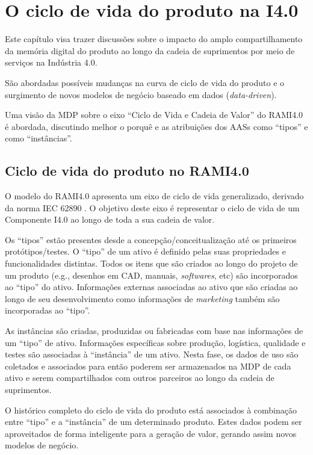 \chapter{O ciclo de vida do produto na I4.0}
\label{cha:ciclo-de-vida}
	
	Este capítulo visa trazer discussões sobre o impacto do amplo compartilhamento da memória digital do produto ao longo da cadeia de suprimentos por meio de serviços na Indústria 4.0.
	
	São abordadas possíveis mudanças na curva de ciclo de vida do produto e o surgimento de novos modelos de negócio baseado em dados (\textit{data-driven}).
	
	Uma visão da MDP sobre o eixo ``Ciclo de Vida e Cadeia de Valor'' do RAMI4.0 é abordada, discutindo melhor o porquê e as atribuições dos AASs como ``tipos'' e como ``instâncias''.

\section{Ciclo de vida do produto no RAMI4.0}
	
	O modelo do RAMI4.0 apresenta um eixo de ciclo de vida generalizado, derivado da norma IEC 62890 \cite{adolphs2015rami}. O objetivo deste eixo é representar o ciclo de vida de um Componente I4.0 ao longo de toda a sua cadeia de valor.
	
	Os ``tipos'' estão presentes desde a concepção/conceitualização até os primeiros protótipos/testes. O ``tipo'' de um ativo é definido pelas suas propriedades e funcionalidades distintas. Todos os itens que são criados ao longo do projeto de um produto (e.g., desenhos em CAD, manuais, \textit{softwares}, etc) são incorporados ao ``tipo'' do ativo. Informações externas associadas ao ativo que são criadas ao longo de seu desenvolvimento como informações de \textit{marketing} também são incorporadas ao ``tipo''.
	
	As instâncias são criadas, produzidas ou fabricadas com base nas informações de um ``tipo'' de ativo. Informações específicas sobre produção, logística, qualidade e testes são associadas à ``instância'' de um ativo. Nesta fase, os dados de uso são coletados e associados para então poderem ser armazenados na MDP de cada ativo e serem compartilhados com outros parceiros ao longo da cadeia de suprimentos. 
	
	O histórico completo do ciclo de vida do produto está associados à combinação entre ``tipo'' e a ``instância'' de um determinado produto. Estes dados podem ser aproveitados de forma inteligente para a geração de valor, gerando assim novos modelos de negócio.
	

